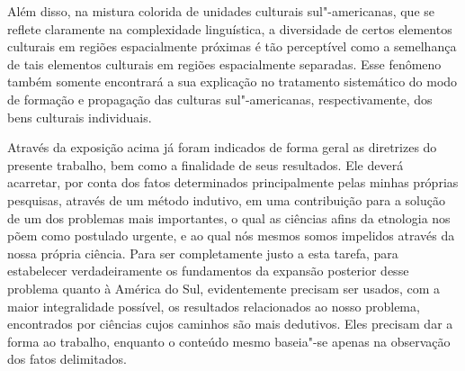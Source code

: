 Além disso, na mistura colorida de unidades culturais sul"-americanas,
que se reflete claramente na complexidade linguística, a diversidade de
certos elementos culturais em regiões espacialmente próximas é tão
perceptível como a semelhança de tais elementos culturais em regiões
espacialmente separadas. Esse fenômeno também somente encontrará a sua
explicação no tratamento sistemático do modo de formação e propagação
das culturas sul"-americanas, respectivamente, dos bens culturais
individuais.

Através da exposição acima já foram indicados de forma geral as
diretrizes do presente trabalho, bem como a finalidade de seus
resultados. Ele deverá acarretar, por conta dos fatos determinados
principalmente pelas minhas próprias pesquisas, através de um método
indutivo, em uma contribuição para a solução de um dos problemas mais
importantes, o qual as ciências afins da etnologia nos põem como
postulado urgente, e ao qual nós mesmos somos impelidos através da nossa
própria ciência. Para ser completamente justo a esta tarefa, para
estabelecer verdadeiramente os fundamentos da expansão posterior desse
problema quanto à América do Sul, evidentemente precisam ser usados,
com a maior integralidade possível, os resultados relacionados ao nosso
problema, encontrados por ciências cujos caminhos são mais dedutivos.
Eles precisam dar a forma ao trabalho, enquanto o conteúdo mesmo
baseia"-se apenas na observação dos fatos delimitados.


